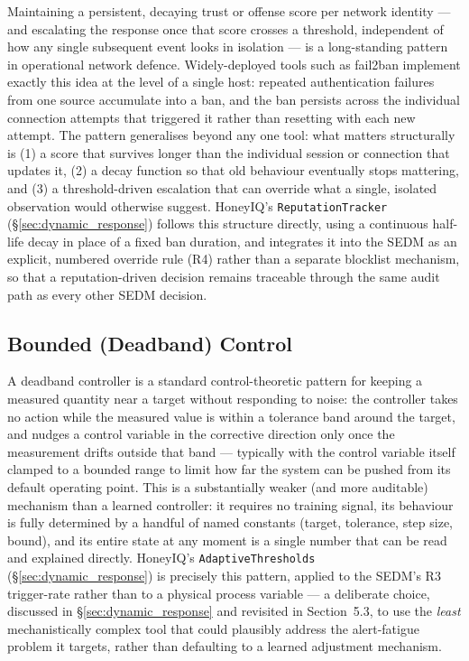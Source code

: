 Maintaining a persistent, decaying trust or offense score per network
identity --- and escalating the response once that score crosses a
threshold, independent of how any single subsequent event looks in
isolation --- is a long-standing pattern in operational network defence.
Widely-deployed tools such as fail2ban implement exactly this idea at the
level of a single host: repeated authentication failures from one source
accumulate into a ban, and the ban persists across the individual connection
attempts that triggered it rather than resetting with each new attempt.
The pattern generalises beyond any one tool: what matters structurally is
(1) a score that survives longer than the individual session or connection
that updates it, (2) a decay function so that old behaviour eventually stops
mattering, and (3) a threshold-driven escalation that can override what a
single, isolated observation would otherwise suggest.
HoneyIQ's \texttt{ReputationTracker} (\S\ref{sec:dynamic_response}) follows
this structure directly, using a continuous half-life decay in place of a
fixed ban duration, and integrates it into the SEDM as an explicit, numbered
override rule (R4) rather than a separate blocklist mechanism, so that a
reputation-driven decision remains traceable through the same audit path as
every other SEDM decision.

\subsection{Bounded (Deadband) Control}

A deadband controller is a standard control-theoretic pattern for keeping a
measured quantity near a target without responding to noise: the controller
takes no action while the measured value is within a tolerance band around
the target, and nudges a control variable in the corrective direction only
once the measurement drifts outside that band --- typically with the control
variable itself clamped to a bounded range to limit how far the system can
be pushed from its default operating point.
This is a substantially weaker (and more auditable) mechanism than a learned
controller: it requires no training signal, its behaviour is fully
determined by a handful of named constants (target, tolerance, step size,
bound), and its entire state at any moment is a single number that can be
read and explained directly.
HoneyIQ's \texttt{AdaptiveThresholds} (\S\ref{sec:dynamic_response}) is
precisely this pattern, applied to the SEDM's R3 trigger-rate rather than to
a physical process variable --- a deliberate choice, discussed in
\S\ref{sec:dynamic_response} and revisited in Section~5.3, to use the
\emph{least} mechanistically complex tool that could plausibly address the
alert-fatigue problem it targets, rather than defaulting to a learned
adjustment mechanism.
